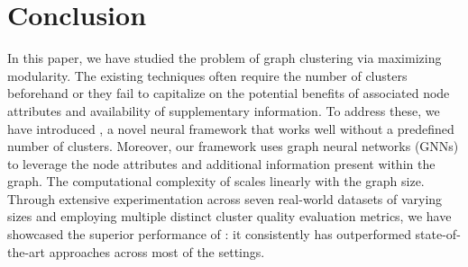 \section{Conclusion}
In this paper, we have studied the problem of graph clustering via maximizing modularity. The existing techniques often require the number of clusters beforehand or they fail to capitalize on the potential benefits of associated node attributes and availability of supplementary information. To address these, we have introduced {\model}, a novel neural framework that works well without a predefined number of clusters. Moreover, our framework uses graph neural networks (GNNs) to leverage the node attributes and additional information present within the graph. The computational complexity of {\model} scales linearly with the graph size.
Through extensive experimentation across seven real-world datasets of varying sizes and employing multiple distinct cluster quality evaluation metrics, we have showcased the superior performance of {\model}: it consistently has outperformed state-of-the-art approaches across most of the settings.
